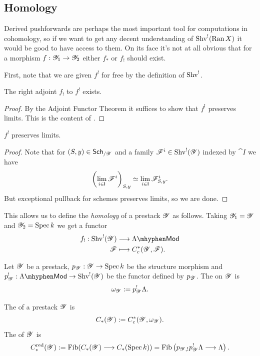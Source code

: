 \documentclass[oneside]{amsart}
\begin{document}
\subsection{Homology}
Derived pushforwards are perhaps the most important tool for computations in cohomology, so if we want to get any decent understanding of $\operatorname{Shv}^{!}(\operatorname{Ran} X)$ it would be good to have access to them. On its face it's not at all obvious that for a morphism $f:\CY_1\to \CY_2$ either $f_*$ or $f_!$ should exist.

First, note that we are given $f^{!}$ for free by the definition of $\operatorname{Shv}^{!}$.

\begin{proposition}
	The right adjoint $f_!$ to $f^{!}$ exists.
\end{proposition}
\begin{proof}
	By the Adjoint Functor Theorem \cite[Corollary~5.5.2.9(ii)]{htt} it suffices to show that $f^{!}$ preserves limits. This is the content of .
\end{proof}

\begin{lemma}\label{lmm:pres-lim}
	$f^{!}$ preserves limits.
\end{lemma}
\begin{proof}
	Note that for $(S,y)\in \mathsf{Sch}_{/\mathscr{Y}}$ and a family $\mathscr{F}^{i}\in \operatorname{Shv}^{!}(\mathscr{Y})$ indexed by $\cat{I}$ we have
	\[
		\left( \lim_{i\in \mathsf{I}}\mathscr{F}^{i} \right)_{S,y} \simeq \lim_{i\in \mathsf{I}} \mathscr{F}^{i}_{S,y}.
	\] 
	But exceptional pullback for schemes preserves limits, so we are done.
\end{proof}

This allows us to define the \emph{homology} of a prestack $\mathscr{Y}$ as follows. Taking $\mathscr{Y}_1=\mathscr{Y}$ and $\mathscr{Y}_2=\operatorname{Spec} k$ we get a functor
\begin{align*}
	f_!: \Shv^{!}(\CY) &\longrightarrow \lMod \\
	\CF &\longmapsto C_c^{*}(\CY,\CF).
\end{align*}
\begin{definition}
	Let $\mathscr{Y}$ be a prestack, $p_\CY:\CY\to \Spec k$ be the structure morphism and $p_\CY^{!}:\lMod\to \Shv^{!}(\CY)$ be the functor defined by $p_{\mathscr{Y}}$. The  on $\mathscr{Y}$ is
	\[
	\omega_{\mathscr{Y}} := p_{\mathscr{Y}}^{!}\Lambda.
	\] 
\end{definition}
\begin{definition}
	The  of a prestack $\mathscr{Y}$ is
	\[
	C_*(\mathscr{Y}) := C^{*}_c(\mathscr{Y},\omega_{\mathscr{Y}}).
	\] 
	The  of $\mathscr{Y}$ is
	\[
	C_*\redu(\CY) \defeq \Fib(C_*(\CY)\to C_*(\Spec k)) = \Fib \left( p_{\CY,!}p_\CY^{!}\Lambda \to \Lambda \right) .	
	\] 
\end{definition}
\end{document}
